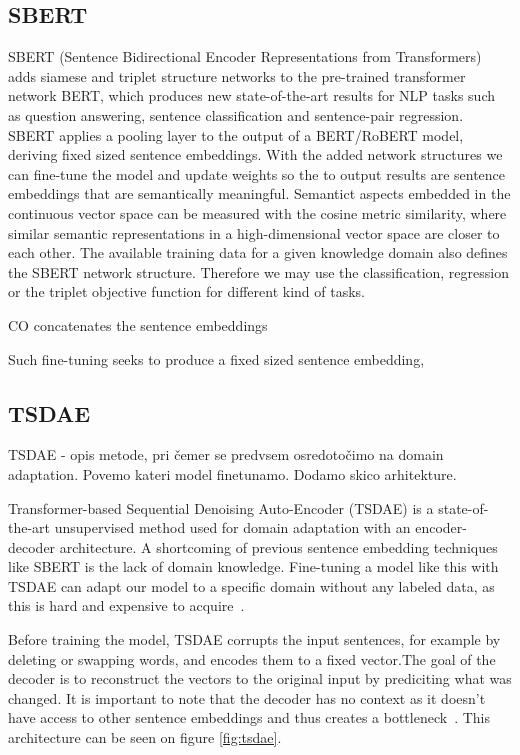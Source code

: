 \documentclass[fleqn,moreauthors,10pt]{ds_report}
\begin{document}
\subsection*{SBERT}
SBERT (Sentence Bidirectional Encoder Representations from Transformers) adds siamese and triplet structure networks to the pre-trained transformer network BERT, which produces new state-of-the-art results for NLP tasks such as question answering, sentence classification and sentence-pair regression. SBERT applies a pooling layer to the output of a BERT/RoBERT model, deriving fixed sized sentence embeddings. With the added network structures we can fine-tune the model and update weights so the to output results are sentence embeddings that are semantically meaningful. Semantict aspects embedded in the continuous vector space can be measured with the cosine metric similarity, where similar semantic representations in a high-dimensional vector space are closer to each other. The available training data for a given knowledge domain also defines the SBERT network structure. Therefore we may use the classification, regression or the triplet objective function for different kind of tasks.

CO concatenates the sentence embeddings 

Such fine-tuning seeks to produce a fixed sized sentence embedding, 


\subsection*{TSDAE}
TSDAE - opis metode, pri čemer se predvsem osredotočimo na domain adaptation. Povemo kateri model finetunamo.
Dodamo skico arhitekture.

Transformer-based Sequential Denoising Auto-Encoder (TSDAE) is a state-of-the-art unsupervised method used for domain adaptation with an encoder-decoder architecture. A shortcoming of previous sentence embedding techniques like SBERT is the lack of domain knowledge. Fine-tuning a model like this with TSDAE can adapt our model to a specific domain without any labeled data, as this is hard and expensive to acquire~\cite{wang-etal-2021-tsdae-using}. 

Before training the model, TSDAE corrupts the input sentences, for example by deleting or swapping words, and encodes them to a fixed vector.The goal of the decoder is to reconstruct the vectors to the original input by prediciting what was changed. It is important to note that the decoder has no context as it doesn't have access to other sentence embeddings and thus creates a bottleneck~\cite{wang-etal-2021-tsdae-using}.  This architecture can be seen on figure \ref{fig:tsdae}.
\end{document}
